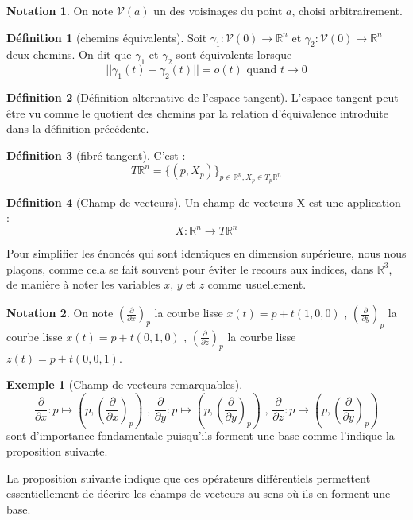 \documentclass{article}
\newcommand{\R}{\mathbb{R}} %
\newcommand{\V}{\mathscr{V}} %
\theoremstyle{definition} %
\newtheorem{defi}{Définition}
\newtheorem{ex}{Exemple}
\newtheorem{nota}{Notation}
\newcommand{\1}{\mathbb{1}} %
\begin{document}
\begin{nota}
On note $\V(a)$ un des voisinages du point $a$, choisi arbitrairement.
\end{nota}

\begin{defi}[chemins équivalents]
Soit $\gamma_1 : \V(0) \to \R^n$ et $\gamma_2 : \V(0) \to \R^n$ deux chemins. 
On dit que $\gamma_1$ et $\gamma_2$ sont équivalents lorsque 
$$||\gamma_1(t) - \gamma_2(t) ||= o(t) \text{ quand } t \to 0$$ 

\end{defi}

\begin{defi}[Définition alternative de l'espace tangent]
L'espace tangent peut être vu comme le quotient des chemins par la relation d'équivalence introduite dans la définition précédente.
\end{defi}

\begin{defi}[fibré tangent]
C'est :
$$T\R^n = \{(p,X_p)\}_{p \in \R^n , X_p \in T_p\R^n}$$
\end{defi}

\begin{defi}[Champ de vecteurs]
Un champ de vecteurs X est une application :
$$X : \R^n \to T \R^n$$
\end{defi}

Pour simplifier les énoncés qui sont identiques en dimension supérieure, nous nous plaçons, comme cela se fait souvent pour éviter le recours aux indices, dans $\R^3$, de manière à noter les variables $x$, $y$ et $z$ comme usuellement.

\begin{nota}
On note $(\frac{\partial}{\partial x})_p$ la courbe lisse $x(t)=p + t(1,0,0)$ , 
$(\frac{\partial}{\partial y})_p$ la courbe lisse $x(t)=p + t(0,1,0)$ , 
$(\frac{\partial}{\partial z})_p$ la courbe lisse $z(t)=p + t(0,0,1)$.
\end{nota}

\begin{ex}[Champ de vecteurs remarquables]
$$\frac{\partial}{\partial x} : p \mapsto (p,(\frac{\partial}{\partial x})_p) \text{ , } \frac{\partial}{\partial y} : p \mapsto (p,(\frac{\partial}{\partial y})_p) \text{ , } \frac{\partial}{\partial z} : p \mapsto (p,(\frac{\partial}{\partial y})_p)$$
sont d'importance fondamentale puisqu'ils forment une base comme l'indique la proposition suivante.
\end{ex}

La proposition suivante indique que ces opérateurs différentiels permettent essentiellement de décrire les champs de vecteurs au sens où ils en forment une base.
\end{document}
